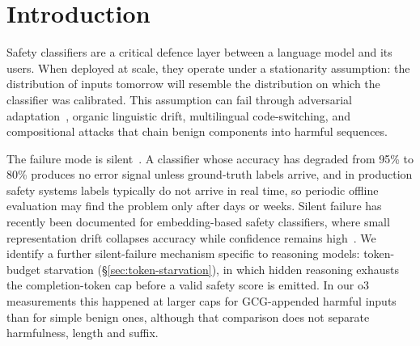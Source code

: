 \documentclass{article}
\begin{document}
\begin{abstract}
\paragraph{Reasoning-token budget starvation.} Reasoning-tier monitors silently fail under tight token budgets, because empty (truncated) responses are parsed as a default score. On o3 the benign valid-scoring rate follows a sigmoid with $T_{50}=46$ tokens ($95\%$ CI $[41,51]$); the adversarial curve is shifted higher ($T_{50,\text{adv}}=117$ tokens, $95\%$ CI $[104,129]$; a $2.5\times$ shift, o3 only, not separating harmfulness, length and suffix). At a 16-token budget o3, o4-mini and gemini-2.5-pro all return 0/100 valid scores.
\end{abstract}

\section{Introduction}
\label{sec:intro}

Safety classifiers are a critical defence layer between a language model and its users. When deployed at scale, they operate under a stationarity assumption: the distribution of inputs tomorrow will resemble the distribution on which the classifier was calibrated. This assumption can fail through adversarial adaptation~\citep{zou2023universal}, organic linguistic drift, multilingual code-switching, and compositional attacks that chain benign components into harmful sequences.

The failure mode is silent~\citep{rabanser2019failing}. A classifier whose accuracy has degraded from 95\% to 80\% produces no error signal unless ground-truth labels arrive, and in production safety systems labels typically do not arrive in real time, so periodic offline evaluation may find the problem only after days or weeks. Silent failure has recently been documented for embedding-based safety classifiers, where small representation drift collapses accuracy while confidence remains high~\citep{sahoo2026collapse}. We identify a further silent-failure mechanism specific to reasoning models: token-budget starvation (\S\ref{sec:token-starvation}), in which hidden reasoning exhausts the completion-token cap before a valid safety score is emitted. In our o3 measurements this happened at larger caps for GCG-appended harmful inputs than for simple benign ones, although that comparison does not separate harmfulness, length and suffix.
\end{document}
